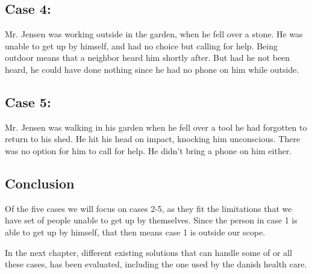 \subsection{Case 4:}
Mr. Jensen was working outside in the garden, when he fell over a stone. He was unable to get up by himself, and had no choice but calling for help. Being outdoor means that a neighbor heard him shortly after. But had he not been heard, he could have done nothing since he had no phone on him while outside.

\subsection{Case 5:}
Mr. Jensen was walking in his garden when he fell over a tool he had forgotten to return to his shed. He hit his head on impact, knocking him unconscious. There was no option for him to call for help. He didn't bring a phone on him either.

\subsection{Conclusion}
Of the five cases we will focus on cases 2-5, as they fit the limitations that we have set of people unable to get up by themselves. Since the person in case 1 is able to get up by himself, that then means case 1 is outside our scope.

In the next chapter, different existing solutions that can handle some of or all these cases, has been evaluated, including the one used by the danish health care.